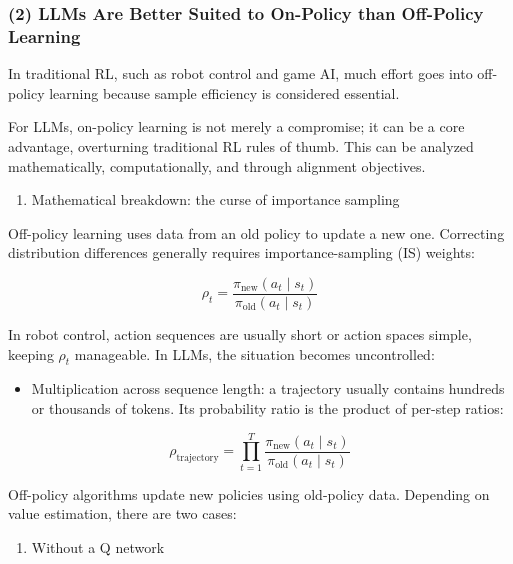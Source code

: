 \hypertarget{llms-are-better-suited-to-on-policy-than-off-policy-learning}{%
\subsubsection{(2) LLMs Are Better Suited to On-Policy than Off-Policy Learning}\label{llms-are-better-suited-to-on-policy-than-off-policy-learning}}

In traditional RL, such as robot control and game AI, much effort goes into off-policy learning because sample efficiency is considered essential.

For LLMs, on-policy learning is not merely a compromise; it can be a core advantage, overturning traditional RL rules of thumb. This can be analyzed mathematically, computationally, and through alignment objectives.

\begin{enumerate}
\def\labelenumi{\arabic{enumi}.}
\tightlist
\item
  Mathematical breakdown: the curse of importance sampling
\end{enumerate}

Off-policy learning uses data from an old policy to update a new one. Correcting distribution differences generally requires importance-sampling (IS) weights:

\[
\rho_t
=
\frac{\pi_{\mathrm{new}}(a_t \mid s_t)}
{\pi_{\mathrm{old}}(a_t \mid s_t)}
\]

In robot control, action sequences are usually short or action spaces simple, keeping \(\rho_t\) manageable. In LLMs, the situation becomes uncontrolled:

\begin{itemize}
\tightlist
\item
{}
  Multiplication across sequence length: a trajectory usually contains hundreds or thousands of tokens. Its probability ratio is the product of per-step ratios:
\end{itemize}

\[
\rho_{\mathrm{trajectory}}
=
\prod_{t=1}^{T}
\frac{\pi_{\mathrm{new}}(a_t\mid s_t)}
{\pi_{\mathrm{old}}(a_t\mid s_t)}
\]

Off-policy algorithms update new policies using old-policy data. Depending on value estimation, there are two cases:

\begin{enumerate}
\def\labelenumi{(\arabic{enumi})}
\tightlist
\item
  Without a Q network
\end{enumerate}

